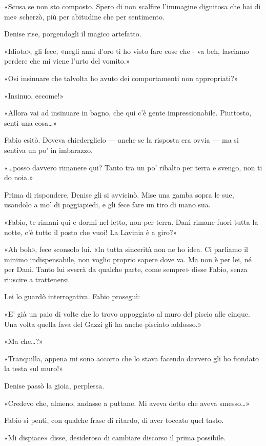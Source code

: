 «Scusa se non sto composto. Spero di non scalfire l'immagine dignitosa che hai di me» scherzò, più per abitudine che per sentimento.

Denise rise, porgendogli il magico artefatto.

«Idiota», gli fece, «negli anni d'oro ti ho visto fare cose che - va beh, lasciamo perdere che mi viene l'urto del vomito.»

«Osi insinuare che talvolta ho avuto dei comportamenti non appropriati?»

«Insinuo, eccome!»

«Allora vai ad insinuare in bagno, che qui c'è gente impressionabile. Piuttosto, senti una cosa\ldots»


Fabio esitò. Doveva chiederglielo --- anche se la risposta era ovvia --- ma si sentiva un po' in imbarazzo.

«\ldots posso davvero rimanere qui? Tanto tra un po' ribalto per terra e svengo, non ti do noia.»

Prima di rispondere, Denise gli si avvicinò. Mise una gamba sopra le sue, usandolo a mo' di poggiapiedi, e gli fece fare un tiro di mano sua.

«Fabio, te rimani qui e dormi nel letto, non per terra. Dani rimane fuori tutta la notte, c'è tutto il posto che vuoi! La Lavinia è a giro?»

«Ah boh», fece sconsolo lui. «In tutta sincerità non ne ho idea. Ci parliamo il minimo indispensabile, non voglio proprio sapere dove va. Ma non è per lei, né per Dani. Tanto lui sverrà da qualche parte, come sempre» disse Fabio, senza riuscire a trattenersi.

Lei lo guardò interrogativa. Fabio proseguì:

«E' già un paio di volte che lo trovo appoggiato al muro del piscio alle cinque. Una volta quella fava del Gazzi gli ha anche pisciato addosso.»

«Ma che\ldots?»

«Tranquilla, appena mi sono accorto che lo stava facendo davvero gli ho fiondato la testa sul muro!»

Denise passò la gioia, perplessa.

«Credevo che, almeno, andasse a puttane. Mi aveva detto che aveva smesso\ldots»

Fabio si pentì, con qualche frase di ritardo, di aver toccato quel tasto.

«Mi dispiace» disse, desideroso di cambiare discorso il prima possibile.

